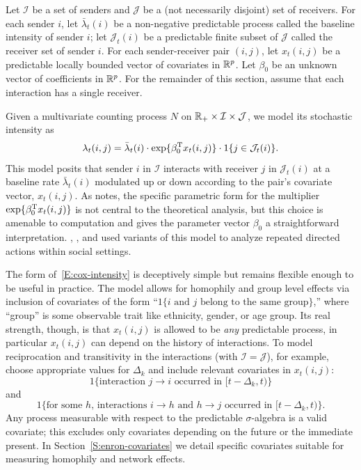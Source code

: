 \documentclass[final]{statsoc}
\begin{document}
Let $\mathcal{I}$ be a set of senders and $\mathcal{J}$ be a (not necessarily disjoint) set of receivers.
For each sender $i$, let $\bar \lambda_t(i)$ be a non-negative predictable
process called the baseline intensity of sender $i$; let $\mathcal{J}_t(i)$ be
a predictable finite subset of $\mathcal{J}$ called the receiver set of sender $i$.
For each sender-receiver pair $(i,j)$, let $x_t(i,j)$ be a predictable
locally bounded vector of covariates in $\mathbb{R}^p$.  Let $\beta_0$
be an unknown vector of coefficients in  $\mathbb{R}^p$.  For the remainder of
this section, assume that each interaction has a single receiver.

Given a multivariate counting process $N$ on
$\mathbb{R}_+ \times \mathcal{I} \times \mathcal{J}$,
we model its stochastic intensity as
\begin{equation}\label{E:cox-intensity}
    \lambda_t(i,j)
        =
        \bar \lambda_t(i)
        \cdot
        \exp\{ \beta_0^{\mathrm{T}} x_t(i, j) \}
        \cdot
        1{\{j \in \mathcal{J}_t(i)\}}.
\end{equation}
This model posits that sender $i$ in $\mathcal{I}$ interacts  with receiver $j$
in $\mathcal{J}_t(i)$ at a baseline rate $\bar \lambda_t(i)$ modulated up or
down according to the pair's covariate vector, $x_t(i,j)$.  As
\citet{efron1977efficiency} notes, the specific parametric form for the multiplier
$\exp\{ \beta_0^{\mathrm{T}} x_t(i,j) \}$ is not central to the theoretical
analysis, but this choice is amenable to computation and gives
the parameter vector $\beta_0$ a straightforward interpretation.
\citet{butts2008relational}, \citet{vu2011continuous}, and
\citet{vu2011dynamic} used variants of this model to analyze
repeated directed actions within social settings.

The form of~\eqref{E:cox-intensity} is deceptively simple but remains
flexible enough to be useful in practice.  The model allows for
homophily and group level effects via inclusion of covariates of the form
``$1\{\text{$i$ and $j$ belong to the same group}\}$,'' where ``group'' is
some observable trait like ethnicity, gender, or age group.  Its real
strength, though, is that $x_t(i,j)$ is allowed to be \emph{any}
predictable process, in particular $x_t(i,j)$ can depend on the history
of interactions.  To model reciprocation and transitivity in the
interactions  (with $\mathcal{I} = \mathcal{J}$), for example, choose appropriate
values for $\Delta_k$ and include relevant covariates in $x_t(i,j)$:
\[
    1\{\text{interaction $j \to i$ occurred in $[t - \Delta_k,t)$}\}
\]
and
\[
    1\{\text{for some $h$, interactions $i\to h$ and $h \to j$ occurred in
             $[t - \Delta_k, t)$}\}.
\]
Any process measurable with respect to the predictable $\sigma$-algebra is
a valid covariate; this excludes only covariates depending on the future
or the immediate present.  In
Section~\ref{S:enron-covariates} we detail specific covariates suitable for
measuring homophily and network effects.
\end{document}
